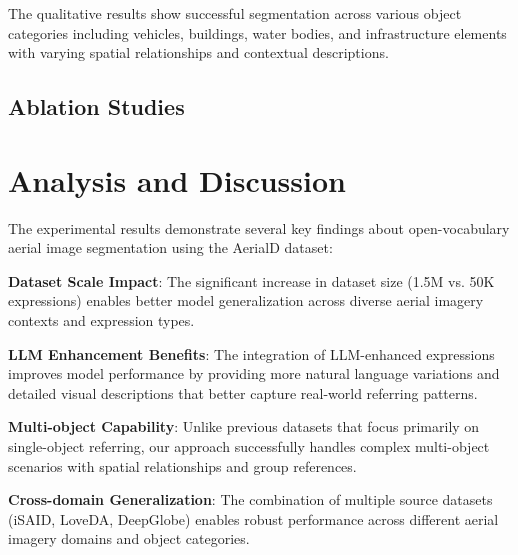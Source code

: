 The qualitative results show successful segmentation across various object categories including vehicles, buildings, water bodies, and infrastructure elements with varying spatial relationships and contextual descriptions.

\subsection{Ablation Studies}

\begin{table}[H]
\centering
\caption{Ablation Study: Expression Type Training Analysis}
\label{tab:ablation_expression_types}
\end{table}

\section{Analysis and Discussion}
The experimental results demonstrate several key findings about open-vocabulary aerial image segmentation using the AerialD dataset:

\textbf{Dataset Scale Impact}: The significant increase in dataset size (1.5M vs. 50K expressions) enables better model generalization across diverse aerial imagery contexts and expression types.

\textbf{LLM Enhancement Benefits}: The integration of LLM-enhanced expressions improves model performance by providing more natural language variations and detailed visual descriptions that better capture real-world referring patterns.

\textbf{Multi-object Capability}: Unlike previous datasets that focus primarily on single-object referring, our approach successfully handles complex multi-object scenarios with spatial relationships and group references.

\textbf{Cross-domain Generalization}: The combination of multiple source datasets (iSAID, LoveDA, DeepGlobe) enables robust performance across different aerial imagery domains and object categories.